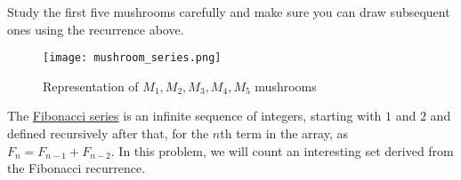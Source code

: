 \documentclass[addpoints]{exam}
\begin{document}
\begin{questions}
Study the first five mushrooms carefully and make sure you can draw subsequent ones using the recurrence above.

\begin{figure}[h]
  \centering
  \texttt{[image: mushroom\_series.png]}
  \caption{Representation of $M_1,M_2,M_3,M_4,M_5$ mushrooms}
  \label{fig:mushroom_anatomy}
\end{figure}


\question
    The \href{https://en.wikipedia.org/wiki/Fibonacci_number}{Fibonacci series} is an infinite sequence of integers, starting with $1$ and $2$ and defined recursively after that, for the $n$th term in the array, as $F_n = F_{n-1} + F_{n-2}$. In this problem, we will count an interesting set derived from the Fibonacci recurrence.
    

\end{questions}
\end{document}
